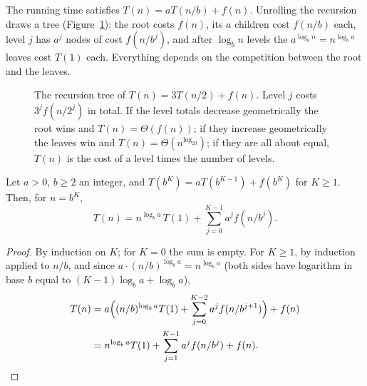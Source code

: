 The running time satisfies $T(n)=aT(n/b)+f(n)$. Unrolling the recursion draws a tree (Figure~\ref{fig:rectree}): the root costs $f(n)$, its
$a$ children cost $f(n/b)$ each, level $j$ has $a^j$ nodes of cost $f(n/b^j)$, and after $\log_bn$ levels the $a^{\log_bn}=n^{\log_ba}$ leaves
cost $T(1)$ each. Everything depends on the competition between the root and the leaves.

\begin{figure}[ht]
\centering
{}
\caption{The recursion tree of $T(n)=3T(n/2)+f(n)$. Level $j$ costs $3^jf(n/2^j)$ in total. If the level totals decrease geometrically the
root wins and $T(n)=\Theta(f(n))$; if they increase geometrically the leaves win and $T(n)=\Theta(n^{\log_23})$; if they are all about equal,
$T(n)$ is the cost of a level times the number of levels.}
\label{fig:rectree}
\end{figure}

\begin{lemma}\label{lem:unroll}
Let $a>0$, $b\ge2$ an integer, and $T(b^K)=aT(b^{K-1})+f(b^K)$ for $K\ge1$. Then, for $n=b^K$,
\[
T(n)=n^{\log_ba}\,T(1)+\sum_{j=0}^{K-1}a^jf(n/b^j).
\]
\end{lemma}
\begin{proof}
By induction on $K$; for $K=0$ the sum is empty. For $K\ge1$, by induction applied to $n/b$, and since $a\cdot(n/b)^{\log_ba}=n^{\log_ba}$
(both sides have logarithm in base $b$ equal to $(K-1)\log_ba+\log_ba$),
\[
\begin{aligned}
T(n)&=a\Bigl((n/b)^{\log_ba}T(1)+\sum_{j=0}^{K-2}a^jf(n/b^{j+1})\Bigr)+f(n)\\
&=n^{\log_ba}T(1)+\sum_{j=1}^{K-1}a^jf(n/b^j)+f(n).
\end{aligned}
\]
\end{proof}

